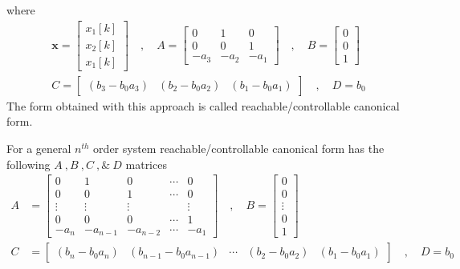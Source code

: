 \documentclass[twoside]{article}
\begin{document}
%
where 
%
\begin{align*}
\mathbf{x} = \left[ \begin{array}{c} x_1[k] \\ x_2[k] \\
x_1[k] \end{array} \right] \quad , \quad
A = \left[ \begin{array}{ccc} 0 & 1 & 0 \\ 0 & 0 & 1
    \\ -a_3 & -a_2 & -a_1 \end{array} \right]
\quad , \quad 
B = \left[ \begin{array}{c} 0\\ 0 
    \\ 1 \end{array} \right]
\\ C = \left[ \begin{array}{ccc} (b_3 - b_0 a_3) &  (b_2 - b_0 a_2) &
   (b_1 - b_0 a_1) \end{array} \right]
\quad , \quad
D = b_0
\end{align*}
%
The form obtained with this approach is called
reachable/controllable canonical form. 

For a general $n^{th}$ order system reachable/controllable
canonical form has the following $A \ ,  B \ ,  C \ , \& \ D$
matrices
%
\begin{align*}
A &= \left[ \begin{array}{ccccc} 0 & 1 & 0 & \cdots & 0 \\ 0 & 0 & 1 &
                                                                      \cdots & 0
\\ \vdots & \vdots & \vdots & & \vdots
\\ 0 & 0 & 0 & \cdots & 1
    \\ -a_n & -a_{n-1} & -a_{n-2} & \cdots & -a_1 \end{array} \right]
\quad , \quad 
B = \left[ \begin{array}{c} 0\\ 0 \\ \vdots \\ 0
    \\ 1 \end{array} \right]
\\ C &= \left[ \begin{array}{ccccc} (b_n - b_0 a_n) 
  &  (b_{n-1} - b_0 a_{n-1}) & \cdots &  (b_2 - b_0 a_2) &
   (b_1 - b_0 a_1) \end{array} \right]
\quad , \quad
D = b_0
\end{align*}
\end{document}
